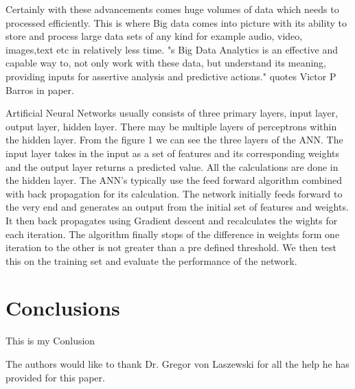 \documentclass[sigconf]{acmart}
\begin{document}
Certainly with these advancements comes huge volumes of data which needs to processed efficiently. This is where Big data comes into picture with its ability to store and process large data sets of any kind for example audio, video, images,text etc in relatively less time. "s Big Data Analytics is an effective and capable way to, not only work with these data, but understand its meaning, providing inputs for assertive analysis and predictive actions."\cite{2} quotes Victor P Barros in paper.

Artificial Neural Networks usually consists of three primary layers, input layer, output layer, hidden layer. There may be multiple layers of perceptrons within the hidden layer. From the figure 1 we can see the three layers of the ANN. The input layer takes in the input as a set of features and its corresponding weights and the output layer returns a predicted value. All the calculations are done in the hidden layer. The ANN's typically use the feed forward algorithm combined with back propagation for its calculation. The network initially feeds forward to the very end and generates an output from the initial set of features and weights. It then back propagates using Gradient descent and recalculates the wights for each iteration. The algorithm finally stops of the difference in weights form one iteration to the other is not greater than a pre defined threshold. We then test this on the training set and evaluate the performance of the network.


\section{Conclusions}

This is my Conlusion


\begin{acks}

  The authors would like to thank Dr. Gregor von Laszewski for all the help he has provided for this paper.
\end{acks}


 
\end{document}
